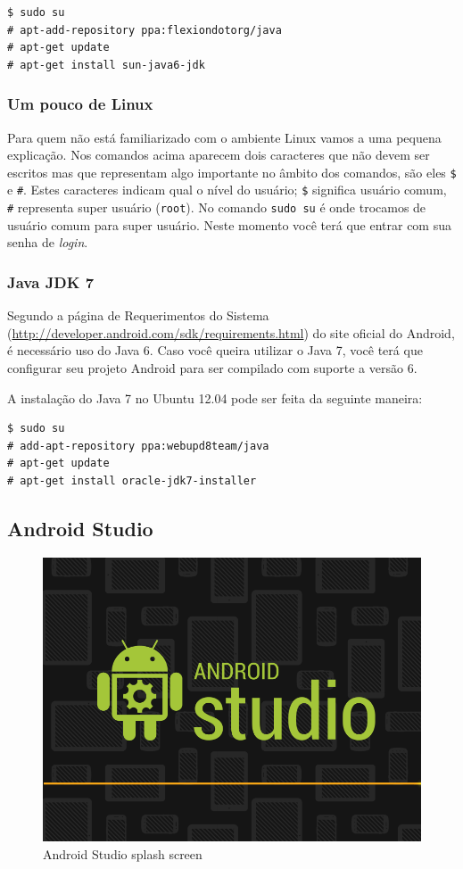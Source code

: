 \begin{verbatim}
$ sudo su
# apt-add-repository ppa:flexiondotorg/java
# apt-get update
# apt-get install sun-java6-jdk
\end{verbatim}
\subsubsection{Um pouco de Linux}

Para quem não está familiarizado com o ambiente Linux vamos a uma
pequena explicação. Nos comandos acima aparecem dois caracteres que não
devem ser escritos mas que representam algo importante no âmbito dos
comandos, são eles \texttt{\$} e \texttt{\#}. Estes caracteres indicam
qual o nível do usuário; \texttt{\$} significa usuário comum,
\texttt{\#} representa super usuário (\texttt{root}). No comando
\texttt{sudo su} é onde trocamos de usuário comum para super usuário.
Neste momento você terá que entrar com sua senha de \emph{login}.

\subsubsection{Java JDK 7}

Segundo a página de Requerimentos do Sistema
(\url{http://developer.android.com/sdk/requirements.html}) do site
oficial do Android, é necessário uso do Java 6. Caso você queira
utilizar o Java 7, você terá que configurar seu projeto Android para ser
compilado com suporte a versão 6.

A instalação do Java 7 no Ubuntu 12.04 pode ser feita da seguinte
maneira:

\begin{verbatim}
$ sudo su
# add-apt-repository ppa:webupd8team/java
# apt-get update
# apt-get install oracle-jdk7-installer
\end{verbatim}
\subsection{Android Studio}

\begin{figure}[h]
\centering
\includegraphics[scale=0.4]{img/preparando-ambiente/android-studio-splash.png}
\caption{Android Studio splash screen}
\end{figure}

